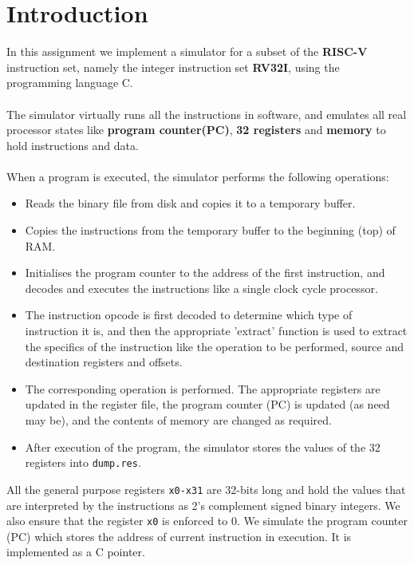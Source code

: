 \newpage{}
\section{Introduction}
In this assignment we implement a simulator for a subset of the \textbf{RISC-V} instruction set, namely the integer instruction set \textbf{RV32I}, using the programming language C.\\
\\
The simulator virtually runs all the instructions in software, and emulates all real processor states like \textbf{program counter(PC)}, \textbf{32 registers} and \textbf{memory} to hold instructions and data.\\
\\
When a program is executed, the simulator performs the following operations:
\begin{itemize}
    \item Reads the binary file from disk and copies it to a temporary buffer.
    \item Copies the instructions from the temporary buffer to the beginning (top) of RAM.
    \item Initialises the program counter to the address of the first instruction, and decodes and executes the instructions like a single clock cycle processor.
    \item The instruction opcode is first decoded to determine which type of instruction it is, and then the appropriate 'extract' function is used to extract the specifics of the instruction like the operation to be performed, source and destination registers and offsets.
    \item The corresponding operation is performed. The appropriate registers are updated in the register file, the program counter (PC) is updated (as need may be), and the contents of memory are changed as required.
    \item After execution of the program, the simulator stores the values of the 32 registers into \texttt{dump.res}. 
\end{itemize}

All the general purpose registers \texttt{x0-x31} are 32-bits long and hold the values that are interpreted by the instructions as 2's complement signed binary integers. We also ensure that the register \texttt{x0} is enforced to 0. We simulate the program counter (PC) which stores the address of current instruction in execution. It is implemented as a C pointer. 
\newpage

